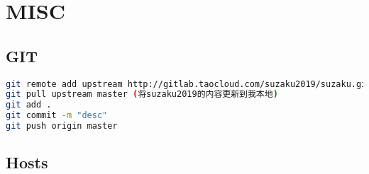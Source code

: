 \chapter{MISC}

\section{GIT}

\begin{lstlisting}[language=bash,frame=single]
git remote add upstream http://gitlab.taocloud.com/suzaku2019/suzaku.git
git pull upstream master (将suzaku2019的内容更新到我本地)
git add .
git commit -m "desc"
git push origin master
\end{lstlisting}

\section{Hosts}
